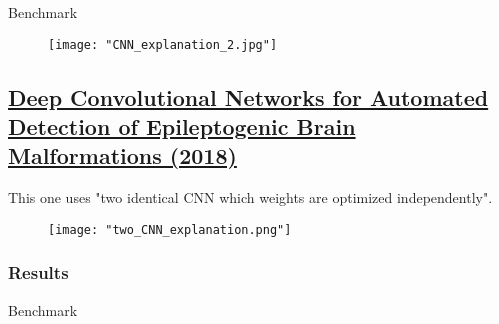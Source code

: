 \begin{table}[htbp]
	\centering
	\caption{Benchmark}

	\caption{Results}
\end{table}

\begin{figure}[htbp]
	\centering
	\texttt{[image: "CNN\_explanation\_2.jpg"]}
\end{figure}
\newpage

\subsection{\href{https://link.springer.com/chapter/10.1007/978-3-030-00931-1_56}{Deep Convolutional Networks for Automated Detection of Epileptogenic Brain Malformations (2018)}}

This one uses "two identical CNN which weights are optimized independently".

\begin{figure}[htbp]
	\centering
	\texttt{[image: "two\_CNN\_explanation.png"]}
\end{figure}

\subsubsection{Results}

\begin{table}[htbp]
	\centering
	\caption{Benchmark}

	\caption{Results}
\end{table}

